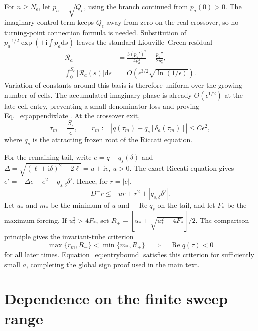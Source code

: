 \documentclass[reprint,superscriptaddress,floatfix,amsmath,amssymb,prresearch,aps]{revtex4-2}
\newcommand{\dd}{\mathrm{d}}
\newcommand{\ii}{\mathrm{i}}
\newcommand{\Ree}{\operatorname{Re}}
\begin{document}
For \(n\geq N_\epsilon\), let \(p_a=\sqrt{Q_\epsilon}\), using the branch
continued from \(p_a(0)>0\). The imaginary control term keeps
\(Q_\epsilon\) away from zero on the real crossover, so no turning-point
connection formula is needed. Substitution of
\(p_a^{-1/2}\exp(\pm\ii\int p_a\dd s)\) leaves the standard
Liouville--Green residual
\begin{equation}
\begin{aligned}
\mathcal R_a
&=\frac{3(p_a')^2}{4p_a^3}-\frac{p_a''}{2p_a^2},\\
\int_0^{S_\epsilon}|\mathcal R_a(s)|\dd s
&=O\!\left(\epsilon^{3/2}\sqrt{\ln(1/\epsilon)}\right).
\end{aligned}
\label{eq:LGresidual}
\end{equation}
Variation of constants around this basis is therefore uniform over the
growing number of cells. The accumulated imaginary phase is already
\(O(\epsilon^{1/2})\) at the late-cell entry, preventing a small-denominator
loss and proving Eq.~\eqref{eq:appendixlate}. At the crossover exit,
\begin{equation}
\tau_m=\frac{S_\epsilon}{\epsilon},
\qquad
r_m:=|q(\tau_m)-q_s[\delta_a(\tau_m)]|\leq C\epsilon^2,
\label{eq:entrybound}
\end{equation}
where \(q_s\) is the attracting frozen root of the Riccati equation.

For the remaining tail, write \(e=q-q_s(\delta)\) and
\(\Delta=\sqrt{(\ell+\ii\delta)^2-2\ell}=u+\ii v\), \(u>0\). The exact
Riccati equation gives
\(e'=-\Delta e-e^2-q_{s,\delta}\delta'\). Hence, for \(r=|e|\),
\begin{equation}
D^+r\leq-u r+r^2+|q_{s,\delta}\delta'|.
\label{eq:tubeinequality}
\end{equation}
Let \(u_*\) and \(m_*\) be the minimum of \(u\) and \(-\Ree q_s\) on the
tail, and let \(F_*\) be the maximum forcing. If \(u_*^2>4F_*\), set
\(R_\pm=[u_*\pm\sqrt{u_*^2-4F_*}]/2\). The comparison principle gives
the invariant-tube criterion
\begin{equation}
\max\{r_m,R_-\}<\min\{m_*,R_+\}
\quad\Longrightarrow\quad
\Ree q(\tau)<0
\label{eq:tubecriterion}
\end{equation}
for all later times. Equation~\eqref{eq:entrybound} satisfies this criterion
for sufficiently small \(a\), completing the global sign proof used in the
main text.


\section{Dependence on the finite sweep range}
\end{document}
